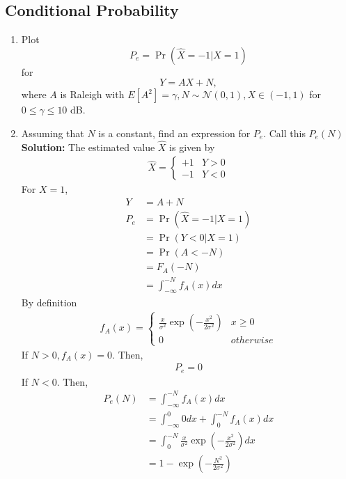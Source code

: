 \documentclass{article}
\numberwithin{equation}{subsection}
\numberwithin{figure}{subsection}
\providecommand{\brak}[1]{\ensuremath{\left(#1\right)}}
\providecommand{\sbrak}[1]{\ensuremath{{}\left[#1\right]}}
\providecommand{\pr}[1]{\ensuremath{\Pr\left(#1\right)}}
\providecommand{\gauss}[2]{\mathcal{N}\ensuremath{\left(#1,#2\right)}}
\newcommand{\solution}{\noindent \textbf{Solution: }}
\renewcommand\thesection{\arabic{section}}
\renewcommand\thesubsection{\thesection.\arabic{subsection}}
\begin{document}
\subsection{Conditional Probability}
\begin{enumerate}[label=\thesubsection.\arabic*,ref=\thesubsection.\arabic{figure}]
\item
\label{ch4_sim}
Plot 
\begin{equation}
P_e = \pr{\hat{X} = -1|X=1}
\end{equation}
%
for 
\begin{equation}
Y = AX+N,
\end{equation}
where $A$ is Raleigh with $E\sbrak{A^2} = \gamma, N \sim \gauss{0}{1}, X \in \brak{-1,1}$ for $0 \le \gamma \le 10$ dB.
\item
Assuming that $N$ is a constant, find an expression for $P_e$.  Call this $P_e(N)$\\
\solution The estimated value $\hat{X}$ is given by
\begin{align}
\hat{X} = 
\begin{cases}
+1 & Y>0\\
-1 & Y<0
\end{cases}
\end{align}
For $X = 1$, 
\begin{align}
Y &= A + N\\
P_e &= \pr{\hat{X} = -1|X=1} \\
&= \pr{Y<0 |X=1}\\
&= \pr{A<-N}\\
&= F_A(-N)\\
&= \int_{-\infty}^{-N} f_A(x)dx
\end{align}
By definition
\begin{align}
f_A(x) = 
\begin{cases}
\frac{x}{\sigma^2}\exp\brak{{-\frac{x^2}{2\sigma^2}}} & x\geq0\\
0 & otherwise
\end{cases}
\end{align}
If $N>0, f_A(x) = 0$. Then,
\begin{align}
 P_e=0  
\end{align}
If $N<0$. Then,
\begin{align}
 P_e(N) &=\int_{-\infty}^{-N} f_A(x)dx\\
 &=\int_{-\infty}^{0} 0dx+\int_{0}^{-N} f_A(x)dx\\
 &=\int_{0}^{-N} \frac{x}{\sigma^2}\exp\brak{{-\frac{x^2}{2\sigma^2}}}dx\\
 &=1-\exp{\brak{-\frac{N^2}{2\sigma^2}}}

\end{align}
\end{enumerate}
\end{document}
